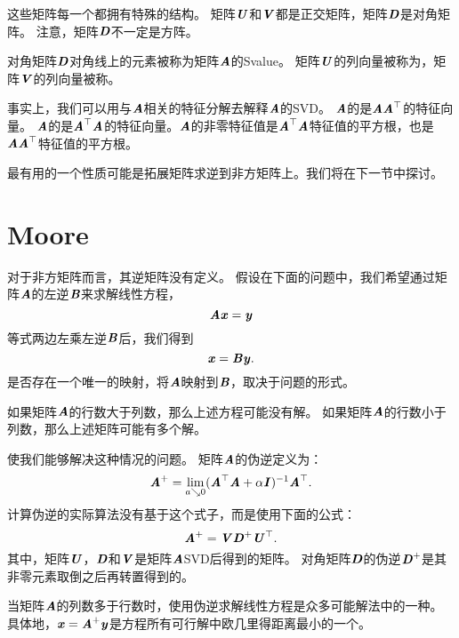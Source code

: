
这些矩阵每一个都拥有特殊的结构。
矩阵$\MU$和$\MV$都是正交矩阵，矩阵$\MD$是对角矩阵。
注意，矩阵$\MD$不一定是方阵。


对角矩阵$\MD$对角线上的元素被称为矩阵$\MA$的\gls{Svalue}。
矩阵$\MU$的列向量被称为，矩阵$\MV$的列向量被称。


事实上，我们可以用与$\MA$相关的特征分解去解释$\MA$的\gls{SVD}。
$\MA$的是$\MA\MA^\top$的特征向量。
$\MA$的是$\MA^\top\MA$的特征向量。$
\MA$的非零特征值是$\MA^\top\MA$特征值的平方根，也是$\MA\MA^\top$特征值的平方根。


最有用的一个性质可能是拓展矩阵求逆到非方矩阵上。我们将在下一节中探讨。




\section{\gls{Moore}}
\label{sec:the_moore_penrose_pseudoinverse_matrix}


对于非方矩阵而言，其逆矩阵没有定义。
假设在下面的问题中，我们希望通过矩阵$\MA$的左逆$\MB$来求解线性方程，
\begin{equation}
    \MA\Vx=\Vy
\end{equation}
等式两边左乘左逆$\MB$后，我们得到
\begin{equation}
    \Vx=\MB\Vy.
\end{equation}
是否存在一个唯一的映射，将$\MA$映射到$\MB$，取决于问题的形式。


如果矩阵$\MA$的行数大于列数，那么上述方程可能没有解。
如果矩阵$\MA$的行数小于列数，那么上述矩阵可能有多个解。


使我们能够解决这种情况的问题。
矩阵$\MA$的伪逆定义为：
\begin{equation}
    \MA^+ = \lim_{a \searrow 0} (\MA^\top\MA + \alpha \MI)^{-1} \MA^\top.
\end{equation}
计算伪逆的实际算法没有基于这个式子，而是使用下面的公式：
\begin{equation}
    \MA^+ = \MV\MD^+\MU^\top.
\end{equation}
其中，矩阵$\MU$，$\MD$和$\MV$是矩阵$\MA$\gls{SVD}后得到的矩阵。
对角矩阵$\MD$的伪逆$\MD^+$是其非零元素取倒之后再转置得到的。


当矩阵$\MA$的列数多于行数时，使用伪逆求解线性方程是众多可能解法中的一种。
具体地，$\Vx=\MA^+\Vy$是方程所有可行解中欧几里得距离最小的一个。


